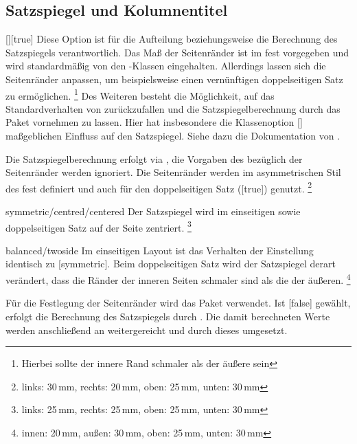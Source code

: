 \subsection{Satzspiegel und Kolumnentitel}
\begin{Declaration}{[\PSet]}[true]%
\printdeclarationlist%
%
%
%
%
Diese Option ist für die Aufteilung beziehungsweise die Berechnung des 
Satzspiegels verantwortlich. Das Maß der Seitenränder ist im \CD fest 
vorgegeben und wird standardmäßig von den \TUDScript-Klassen eingehalten. 
Allerdings lassen sich die Seitenränder anpassen, um beispielsweise einen 
vernünftigen doppelseitigen Satz zu ermöglichen.%
\footnote{Hierbei sollte der innere Rand schmaler als der äußere sein}
Des Weiteren besteht die Möglichkeit, auf das Standardverhalten von 
\KOMAScript{} zurückzufallen und die Satzspiegelberechnung durch das Paket
 vornehmen zu lassen. Hier hat insbesondere die Klassenoption 
[\PSet] maßgeblichen Einfluss auf den Satzspiegel. Siehe dazu die 
Dokumentation von \KOMAScript{}.
%
\begin{values}
\itemfalse
  Die Satzspiegelberechnung erfolgt via , die Vorgaben des 
  \CDs bezüglich der Seitenränder werden ignoriert.
  Die Seitenränder werden im asymmetrischen Stil des \CDs fest definiert und 
  auch für den doppelseitigen Satz ([true]) genutzt.%
  \footnote{links: 30\,mm, rechts: 20\,mm, oben: 25\,mm, unten: 30\,mm}
\item[symmetric/centred/centered]
  Der Satzspiegel wird im einseitigen sowie doppelseitigen Satz auf der Seite 
  zentriert.%
  \footnote{links: 25\,mm, rechts: 25\,mm, oben: 25\,mm, unten: 30\,mm}
\item[balanced/twoside]
  Im einseitigen Layout ist das Verhalten der Einstellung identisch zu
  [symmetric]. Beim doppelseitigen Satz wird der Satzspiegel 
  derart verändert, dass die Ränder der inneren Seiten schmaler sind als die 
  der äußeren.%
  \footnote{innen: 20\,mm, außen: 30\,mm, oben: 25\,mm, unten: 30\,mm}
\end{values}
%
Für die Festlegung der Seitenränder wird das Paket  
verwendet. Ist [false] gewählt, erfolgt die Berechnung des 
Satzspiegels durch . Die damit berechneten Werte werden 
anschließend an  weitergereicht und durch dieses umgesetzt.
\end{Declaration}

